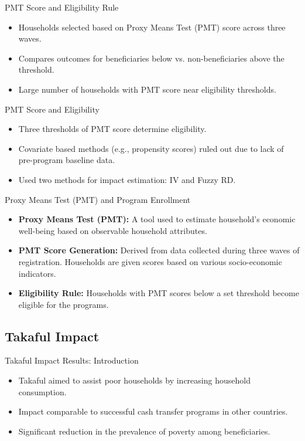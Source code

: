 \documentclass{beamer}
\begin{document}
\begin{frame}{PMT Score and Eligibility Rule}
\begin{itemize}
\item Households selected based on Proxy Means Test (PMT) score across three waves.
\item Compares outcomes for beneficiaries below vs. non-beneficiaries above the threshold.
\item Large number of households with PMT score near eligibility thresholds.
\end{itemize}
\end{frame}


\begin{frame}{PMT Score and Eligibility}
\begin{itemize}
\item Three thresholds of PMT score determine eligibility.
\item Covariate based methods (e.g., propensity scores) ruled out due to lack of pre-program baseline data.
\item Used two methods for impact estimation: IV and Fuzzy RD.
\end{itemize}
\end{frame}

\begin{frame}{Proxy Means Test (PMT) and Program Enrollment}
\begin{itemize}
    \item \textbf{Proxy Means Test (PMT):} A tool used to estimate household's economic well-being based on observable household attributes. 
    \item \textbf{PMT Score Generation:} Derived from data collected during three waves of registration. Households are given scores based on various socio-economic indicators.
    \item \textbf{Eligibility Rule:} Households with PMT scores below a set threshold become eligible for the programs.
\end{itemize}
\end{frame}



\subsection{Takaful Impact}

\begin{frame}{Takaful Impact Results: Introduction}
\begin{itemize}
    \item Takaful aimed to assist poor households by increasing household consumption.
    \item Impact comparable to successful cash transfer programs in other countries.
    \item Significant reduction in the prevalence of poverty among beneficiaries.
\end{itemize}
\end{frame}
\end{document}
